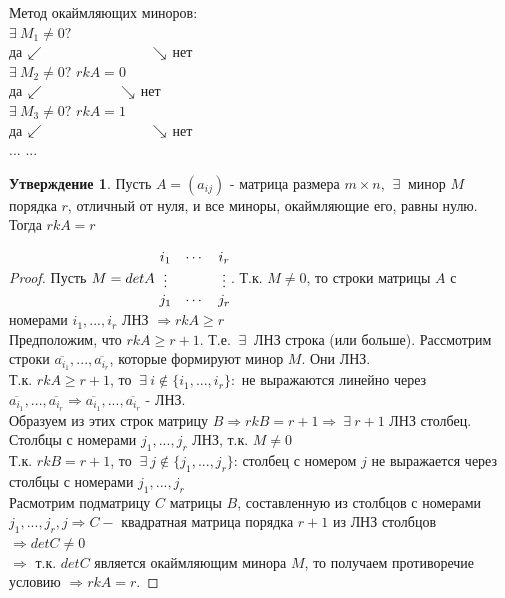 \documentclass[a4paper, 12pt]{article}
\newcommand\tab[1][.5cm]{\hspace*{#1}}
\theoremstyle{definition}
\newtheorem*{subtheorem}{Утверждение}
\begin{document}
  Метод окаймляющих миноров: \vspace{0.2cm}\\
  \tab[7cm]$\exists \ M_1 \not = 0 ?$ \vspace{0.15cm}\\
  \tab[5.5cm] да $\swarrow \tab[2.8cm] \searrow $ нет \vspace{0.15cm}\\
  \tab[4.6cm]$\exists \ M_2 \not = 0 ?$ \tab[2.6cm] $rkA =0$ \vspace{0.15cm}\\ 
  \tab[3.3cm] да $\swarrow \tab[2cm] \searrow $ нет \vspace{0.15cm} \\
  \tab[2.3cm]$\exists \ M_3 \not = 0 ?$ \tab[2cm] $rkA = 1$ \vspace{0.15cm}\\
  \tab[1cm] да $\swarrow \tab[2.8cm] \searrow $ нет \vspace{0.15cm}\\
  \tab[1.3cm]$...$ \tab[4cm] $...$
  \begin{subtheorem}
    Пусть $A = (a_{ij})$ - матрица размера $m \times n$, $\ \exists \ $ минор $M$ порядка $r$, отличный от нуля, и все миноры, окаймляющие его, равны нулю. \\
    Тогда $rkA = r$   
  \end{subtheorem} 
  \begin{proof}
    Пусть $M = detA \ \begin{matrix}
      i_1 & \cdots & i_r \\
      \vdots & \null & \vdots \\
      j_1 & \cdots & j_r
    \end{matrix}$. \vspace{0.3cm} Т.к. $M \not = 0$, то строки матрицы $A$ с номерами $i_1,...,i_r$ ЛНЗ $\Longrightarrow rkA \geq r$ \\
    Предположим, что $rkA \geq r+1$. Т.е. $\ \exists \ $ ЛНЗ строка (или больше). Рассмотрим строки $\overline{a_{i_1}},...,\overline{a_{i_r}}$, которые формируют минор $M$. Они ЛНЗ. \\
    Т.к. $rkA \geq r+1$, то $\ \exists \ i \not \in \{i_1,...,i_r\}: $ не выражаются линейно через \\ $\overline{a_{i_1}},...,\overline{a_{i_r}} \Longrightarrow \overline{a_{i_1}},...,\overline{a_{i_r}}$ - ЛНЗ. \\
    Образуем из этих строк матрицу $B \Longrightarrow rkB = r+1 \Longrightarrow \ \exists \ r+1$ ЛНЗ столбец. \\
    Столбцы с номерами $j_1,...,j_r$ ЛНЗ, т.к. $M \not = 0$ \\
    Т.к. $rkB = r+1$, то $\ \exists \ j \not \in \{j_1,...,j_r\}$: столбец с номером $j$ не выражается через столбцы с номерами $j_1,...,j_r$ \\
    Расмотрим подматрицу $C$ матрицы $B$, составленную из столбцов с номерами $j_1,...,j_r,j \Longrightarrow C-$ квадратная матрица порядка $r+1$ из ЛНЗ столбцов $\Longrightarrow detC \not = 0$\\
    $\Longrightarrow $ т.к. $det C $ является окаймляющим минора $M$, то получаем противоречие условию $\Longrightarrow rkA = r$.    
  \end{proof} 
\end{document}
